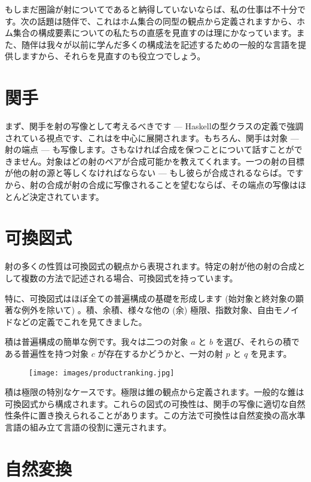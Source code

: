 
\lettrine[lhang=0.17]{も}{し}まだ圏論が射についてであると納得していないならば、私の仕事は不十分です。次の話題は随伴で、これはホム集合の同型の観点から定義されますから、ホム集合の構成要素についての私たちの直感を見直すのは理にかなっています。また、随伴は我々が以前に学んだ多くの構成法を記述するための一般的な言語を提供しますから、それらを見直すのも役立つでしょう。

\section{関手}

まず、関手を射の写像として考えるべきです --- Haskellの型クラスの定義で強調されている視点です、これはを中心に展開されます。もちろん、関手は対象 --- 射の端点 --- も写像します。さもなければ合成を保つことについて話すことができません。対象はどの射のペアが合成可能かを教えてくれます。一つの射の目標が他の射の源と等しくなければならない --- もし彼らが合成されるならば。ですから、射の合成が射の合成に写像されることを望むならば、その端点の写像はほとんど決定されています。

\section{可換図式}

射の多くの性質は可換図式の観点から表現されます。特定の射が他の射の合成として複数の方法で記述される場合、可換図式を持っています。

特に、可換図式はほぼ全ての普遍構成の基礎を形成します (始対象と終対象の顕著な例外を除いて) 。積、余積、様々な他の (余) 極限、指数対象、自由モノイドなどの定義でこれを見てきました。

積は普遍構成の簡単な例です。我々は二つの対象 $a$ と $b$ を選び、それらの積である普遍性を持つ対象 $c$ が存在するかどうかと、一対の射 $p$ と $q$ を見ます。

\begin{figure}[H]
  \centering
  \texttt{[image: images/productranking.jpg]}
\end{figure}

\noindent
積は極限の特別なケースです。極限は錐の観点から定義されます。一般的な錐は可換図式から構成されます。これらの図式の可換性は、関手の写像に適切な自然性条件に置き換えられることがあります。この方法で可換性は自然変換の高水準言語の組み立て言語の役割に還元されます。

\section{自然変換}

